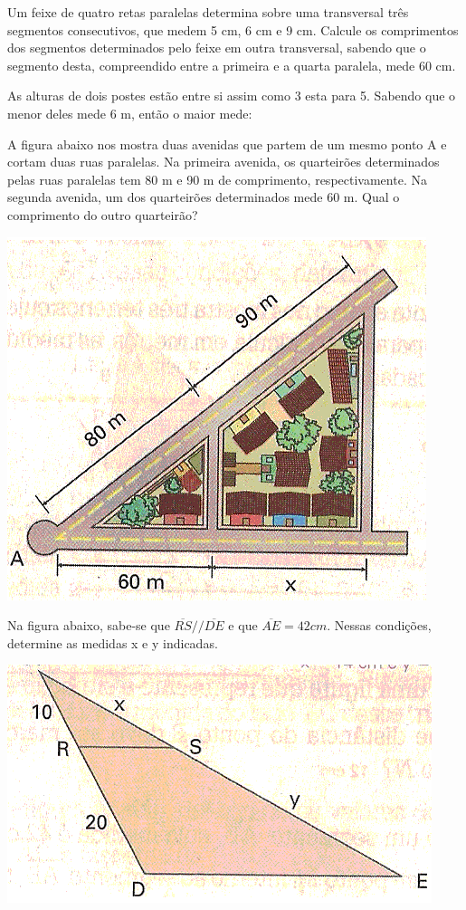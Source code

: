 	\item Um  feixe de quatro retas paralelas determina sobre uma transversal três segmentos consecutivos, que medem 5 cm, 6 cm e 9 cm. Calcule os comprimentos dos segmentos determinados pelo feixe em outra transversal, sabendo que o segmento desta, compreendido entre a primeira e a quarta paralela, mede 60 cm.
	
	\item As alturas de dois postes estão entre si assim como 3 esta para 5. Sabendo que o menor deles mede 6 m, então o maior mede:
	
	\item A figura abaixo nos mostra duas avenidas que partem de um mesmo ponto A e cortam duas ruas paralelas. Na primeira avenida, os quarteirões determinados pelas ruas paralelas tem 80 m e 90 m de comprimento, respectivamente. Na segunda avenida, um dos quarteirões determinados mede 60 m. Qual o comprimento do outro quarteirão?
	\begin{center}
	\includegraphics[scale=0.5]{figuras/fig59.png}
	\end{center}
	
	\item Na figura abaixo, sabe-se que $\overline{RS}//\overline{DE}$ e que $\overline{AE} = 42 cm$. Nessas condições, determine as medidas x  e y indicadas.
	\begin{center}
	\includegraphics[scale=0.5]{figuras/fig60.png}
	\end{center}
	

